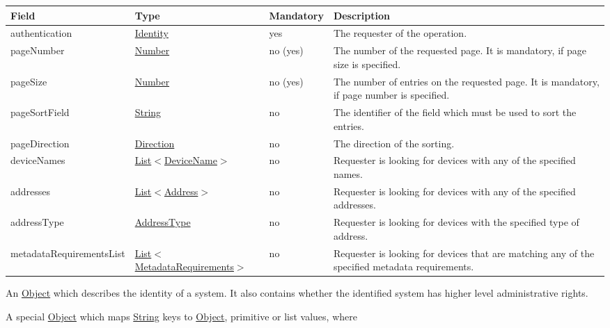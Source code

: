 \documentclass[a4paper]{arrowhead}
\newcommand{\pref}[1]{{\textcolor{ArrowheadGrey}{\hyperref[sec:model:primitives:#1]{#1}}}}
\begin{document}
{}

\begin{table}[ht!]
\begin{tabularx}{\textwidth}{| p{4.3cm} | p{4.8cm} | p{2cm} | X |} \hline
\rowcolor{gray!33} Field & Type & Mandatory & Description \\ \hline
authentication & \hyperref[sec:model:Identity]{Identity} & yes & The requester of the operation. \\ \hline
pageNumber & \pref{Number} & no (yes) & The number of the requested page. It is mandatory, if page size is specified. \\ \hline
pageSize & \pref{Number} & no (yes) & The number of entries on the requested page. It is mandatory, if page number is specified. \\ \hline
pageSortField & \pref{String} & no & The identifier of the field which must be used to sort the entries. \\ \hline
pageDirection & \pref{Direction} & no & The direction of the sorting. \\ \hline
deviceNames &  \pref{List}$<$\pref{DeviceName}$>$ & no & Requester is looking for devices with any of the specified names. \\ \hline
addresses &  \pref{List}$<$\pref{Address}$>$ & no & Requester is looking for devices with any of the specified add\-resses.   \\ \hline
addressType &  \pref{AddressType} & no & Requester is looking for devices with the specified type of add\-ress. \\ \hline
metadataRequirementsList & \pref{List}$<$\hyperref[sec:model:MetadataRequirements]{MetadataRequirements}$>$ & no & Requester is looking for devices that are matching any of the specified metadata requirements. \\ \hline
\end{tabularx}
\end{table}


An \pref{Object} which describes the identity of a system. It also contains whether the identified system has higher level administrative rights.


A special \pref{Object} which maps \pref{String} keys to \pref{Object}, primitive or list values, where 
\end{document}
